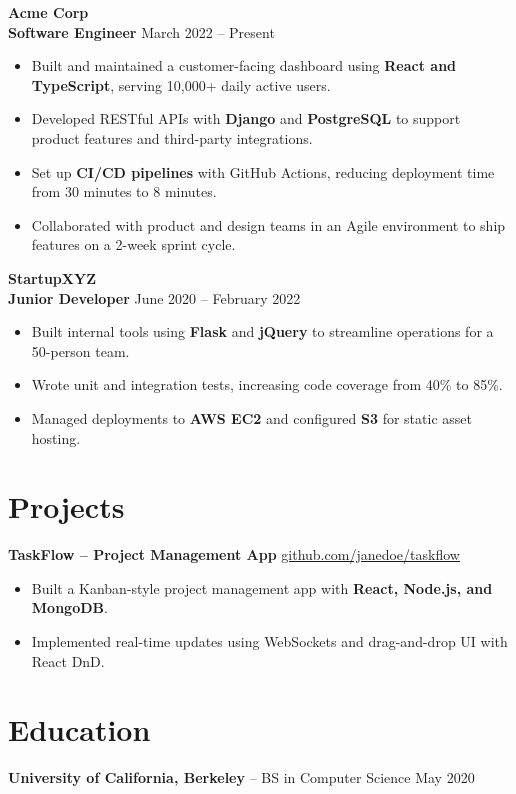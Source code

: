 \documentclass[11pt]{article}
\begin{document}
\textbf{Acme Corp} \\
\textbf{Software Engineer} \hfill March 2022 -- Present \\

\begin{itemize}
  \item Built and maintained a customer-facing dashboard using \textbf{React and TypeScript}, serving 10,000+ daily active users. \\
  \item Developed RESTful APIs with \textbf{Django} and \textbf{PostgreSQL} to support product features and third-party integrations. \\
  \item Set up \textbf{CI/CD pipelines} with GitHub Actions, reducing deployment time from 30 minutes to 8 minutes. \\
  \item Collaborated with product and design teams in an Agile environment to ship features on a 2-week sprint cycle. \\
\end{itemize}

\textbf{StartupXYZ} \\
\textbf{Junior Developer} \hfill June 2020 -- February 2022 \\

\begin{itemize}
  \item Built internal tools using \textbf{Flask} and \textbf{jQuery} to streamline operations for a 50-person team. \\
  \item Wrote unit and integration tests, increasing code coverage from 40\% to 85\%. \\
  \item Managed deployments to \textbf{AWS EC2} and configured \textbf{S3} for static asset hosting. \\
\end{itemize}

\section*{Projects}

\textbf{TaskFlow -- Project Management App} \hfill \href{https://github.com/janedoe/taskflow}{\underline{github.com/janedoe/taskflow}} \\

\begin{itemize}
  \item Built a Kanban-style project management app with \textbf{React, Node.js, and MongoDB}. \\
  \item Implemented real-time updates using WebSockets and drag-and-drop UI with React DnD. \\
\end{itemize}

\section*{Education}

\textbf{University of California, Berkeley} -- BS in Computer Science \hfill May 2020 \\
\end{document}

